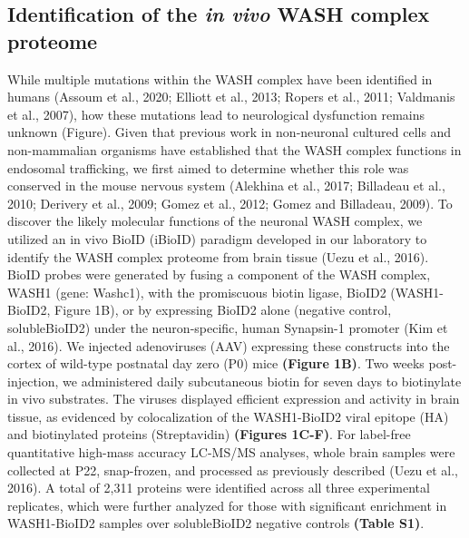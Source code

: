 
\subsection{Identification of the \textit{in vivo} WASH complex proteome}

While multiple mutations within the WASH complex have been identified in humans 
(Assoum et al., 2020; Elliott et al., 2013; Ropers et al., 2011; 
Valdmanis et al., 2007), how these mutations lead to neurological
dysfunction remains unknown (Figure). Given that previous work in
non-neuronal cultured cells and non-mammalian organisms have established that
the WASH complex functions in endosomal trafficking, we first aimed to determine
whether this role was conserved in the mouse nervous system (Alekhina et al.,
2017; Billadeau et al., 2010; Derivery et al., 2009; Gomez et al., 2012; Gomez
and Billadeau, 2009). To discover the likely molecular functions of the neuronal
WASH complex, we utilized an in vivo BioID (iBioID) paradigm developed in our
laboratory to identify the WASH complex proteome from brain tissue (Uezu et al.,
2016). BioID probes were generated by fusing a component of the WASH complex,
WASH1 (gene: Washc1), with the promiscuous biotin ligase, BioID2 (WASH1-BioID2,
Figure 1B), or by expressing BioID2 alone (negative control, solubleBioID2)
under the neuron-specific, human Synapsin-1 promoter (Kim et al., 2016). We
injected adenoviruses (AAV) expressing these constructs into the cortex of
wild-type postnatal day zero (P0) mice \textbf{(Figure 1B)}. Two weeks post-injection, we
administered daily subcutaneous biotin for seven days to biotinylate in vivo
substrates. The viruses displayed efficient expression and activity in brain
tissue, as evidenced by colocalization of the WASH1-BioID2 viral epitope (HA)
and biotinylated proteins (Streptavidin) \textbf{(Figures 1C-F)}. For label-free
quantitative high-mass accuracy LC-MS/MS analyses, whole brain samples were
collected at P22, snap-frozen, and processed as previously described (Uezu et
al., 2016). A total of 2,311 proteins were identified across all three
experimental replicates, which were further analyzed for those with significant
enrichment in WASH1-BioID2 samples over solubleBioID2 negative controls 
\textbf{(Table S1)}. 


